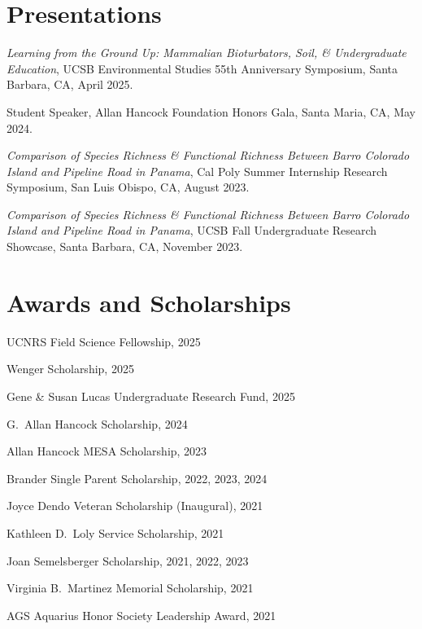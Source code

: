 \documentclass[letterpaper]{article}
\newenvironment{biblist}{%
   \begin{list}{}{%
     \setlength{\labelwidth}{0pt}%
     \setlength{\labelsep}{1em}%
     \setlength{\leftmargin}{2em}%
     \setlength{\itemindent}{-1em}%
   }
}{\end{list}}
\begin{document}
\section*{Presentations}

\begin{biblist}

\item \textit{Learning from the Ground Up: Mammalian Bioturbators, Soil, \& Undergraduate Education}, UCSB Environmental Studies 55th Anniversary Symposium, Santa Barbara, CA, April 2025.

\item Student Speaker, Allan Hancock Foundation Honors Gala, Santa Maria, CA, May 2024.

\item \textit{Comparison of Species Richness \& Functional Richness Between Barro Colorado Island and Pipeline Road in Panama}, Cal Poly Summer Internship Research Symposium, San Luis Obispo, CA, August 2023.

\item \textit{Comparison of Species Richness \& Functional Richness Between Barro Colorado Island and Pipeline Road in Panama}, UCSB Fall Undergraduate Research Showcase, Santa Barbara, CA, November 2023.

\end{biblist}


\section*{Awards and Scholarships}

\begin{biblist}
\item UCNRS Field Science Fellowship, 2025
\item Wenger Scholarship, 2025
\item Gene \& Susan Lucas Undergraduate Research Fund, 2025
\item G.\ Allan Hancock Scholarship, 2024
\item Allan Hancock MESA Scholarship, 2023
\item Brander Single Parent Scholarship, 2022, 2023, 2024
\item Joyce Dendo Veteran Scholarship (Inaugural), 2021
\item Kathleen D.\ Loly Service Scholarship, 2021
\item Joan Semelsberger Scholarship, 2021, 2022, 2023
\item Virginia B.\ Martinez Memorial Scholarship, 2021
\item AGS Aquarius Honor Society Leadership Award, 2021
\end{biblist}
\end{document}
